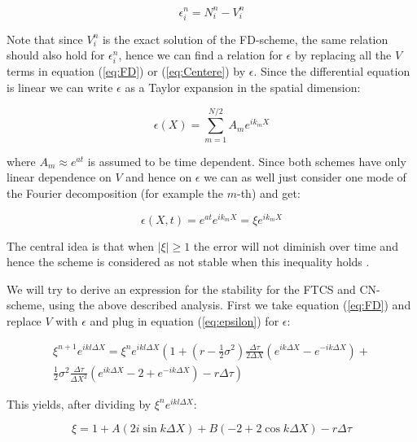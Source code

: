 \documentclass[11pt,a4paper]{article}
\begin{document}
\begin{equation*}
  \epsilon^n_i = N^n_i - V^n_i
\end{equation*}

Note that since $V^n_i$ is the exact solution of the FD-scheme, the same relation should also hold for $\epsilon^n_i$, hence we can find a relation for $\epsilon$ by replacing all the $V$ terms in equation (\ref{eq:FD}) or (\ref{eq:Centere}) by $\epsilon$. Since the differential equation is linear we can write $\epsilon$ as a Taylor expansion in the spatial dimension:

\begin{equation*}
  \epsilon(X) = \sum^{N/2}_{m=1} A_m e^{ik_mX}
\end{equation*}

where $A_m \approx e^{at}$ is assumed to be time dependent. Since both schemes have only linear dependence on $V$ and hence on $\epsilon$ we can as well just consider one mode of the Fourier decomposition (for example the $m$-th) and get:

\begin{equation*}
  \label{eq:epsilon}
  \epsilon(X,t) = e^{at}e^{ik_mX} = \xi e^{ik_mX}
\end{equation*}

The central idea is that when $|\xi| \geq 1$ the error will not diminish over time and hence the scheme is considered as not stable when this inequality holds \cite{Isaacson}.

We will try to derive an expression for the stability for the FTCS and CN-scheme, using the above described analysis. First we take equation (\ref{eq:FD}) and replace $V$ with $\epsilon$ and plug in equation (\ref{eq:epsilon}) for $\epsilon$:

\begin{align*}
  \xi^{n+1}e^{ikl\Delta X} = \xi^ne^{ikl\Delta X}\left(1 + \left(r-\frac{1}{2}\sigma^2\right)\frac{\Delta \tau}{2\Delta X}\left(e^{ik\Delta X} - e^{-ik\Delta X}\right) + \right. \\
  \left.  \frac{1}{2}\sigma^2\frac{\Delta \tau}{\Delta X^2}\left(e^{ik\Delta X} -2 + e^{-ik\Delta X}\right) - r\Delta \tau \right)
\end{align*}

This yields, after dividing by $\xi^ne^{ikl\Delta X}$:

\begin{equation*}
  \xi = 1 + A(2i \sin{k\Delta X}) + B(-2 + 2\cos{k\Delta X}) - r\Delta \tau
\end{equation*}
\end{document}
